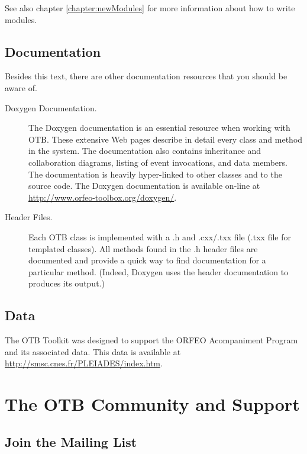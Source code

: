 See also chapter \ref{chapter:newModules} for more information about how to write modules.

\subsection{Documentation}
\label{sec:Documentation}

Besides this text, there are other documentation resources that you should be
aware of.
\begin{description}
        \item[Doxygen Documentation.] The Doxygen documentation is an
        essential resource when working with OTB. These extensive Web
        pages describe in detail every class and method in the
        system. The documentation also contains inheritance and
        collaboration diagrams, listing of event invocations, and data
        members. The documentation is heavily hyper-linked to other
        classes and to the source code. The Doxygen documentation is
        available on-line at
        \url{http://www.orfeo-toolbox.org/doxygen/}.

	\item[Header Files.] Each OTB class is implemented with a .h and
        .cxx/.txx file (.txx file for templated classes). All methods
        found in the .h header files are documented and provide a quick way
        to find documentation for a particular method. (Indeed, Doxygen uses
        the header documentation to produces its output.)
\end{description}

\subsection{Data}
\label{sec:Data}

The OTB Toolkit was designed to support the ORFEO Acompaniment Program
and its associated data. This data is available at
\url{http://smsc.cnes.fr/PLEIADES/index.htm}.



\section{The OTB Community and Support}
\label{sec:AdditionalResources}

\subsection{Join the Mailing List}
\label{sec:JoinMailList}

